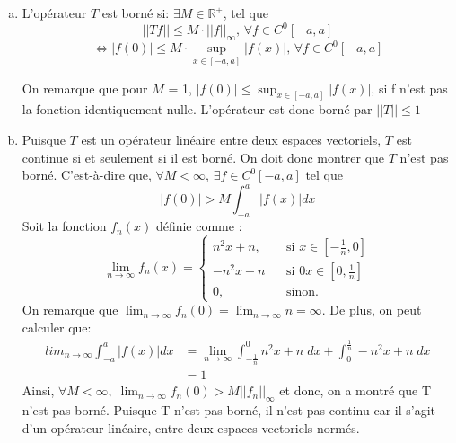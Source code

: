 \documentclass[letterpaper,12pt,oneside,final]{book}
\begin{document}
\begin{enumerate}[a)]

\item %
L'opérateur \( T \) est borné si: \( \exists M \in \mathbb{R}^{+}  \), tel que 
\[ \lvert \lvert  Tf \rvert \rvert \leq M\cdot \lvert \lvert  f \rvert \rvert _{\infty }, \, \forall f \in C^{0}[-a,a] \]
\[ \iff \lvert f(0) \rvert \leq M\cdot \sup_{x\in[-a,a]} \lvert f(x) \rvert , \, \forall f\in C^{0}[-a,a] \]

On remarque que pour \( M \) = 1, \( \lvert f(0) \rvert \leq \sup_{x\in [-a,a]} \lvert f(x) \rvert  \), si f n'est 
pas la fonction identiquement nulle.
L'opérateur est donc borné par \( \lvert \lvert  T \rvert \rvert \leq 1 \)


\item %
Puisque \( T \) est un opérateur linéaire entre deux espaces vectoriels, \( T \) est continue si et 
seulement si il est borné. On doit donc montrer que \( T \) n'est pas borné. C'est-à-dire que, 
\( \forall M < \infty, \, \exists f \in C^{0}[-a,a] \) tel que
\[ \lvert f(0) \rvert > M \int_{-a}^{a} \lvert f(x) \rvert dx \]
Soit la fonction \( f_{n}(x)\) définie comme : 
\begin{equation*}
\lim_{n \to \infty}f_{n}(x) = \begin{cases}
        n^{2}x + n, &\;\; \text{ si } x\in [-\frac{1}{n},0] \\ 
        -n^{2}x +n &\;\; \text{ si } 0  x \in [0,\frac{1}{n}]\\ 
        0, & \;\; \text{ sinon}.
    \end{cases}
\end{equation*}
On remarque que \( \lim_{n \to \infty} f_n (0) = \lim_{n \to \infty} n = \infty \). De plus, on peut calculer que:
\begin{equation*}
\begin{split}
    lim_{n \to \infty} \int_{-a}^{a}\lvert f(x) \rvert dx & = \lim_{n \to \infty} \int_{-\frac{1}{n}}^{0} n^{2}x+ n\;dx + 
\int_{0}^{\frac{1}{n}} -n^{2}x + n\;dx \\ 
& = 1
\end{split}
\end{equation*}
Ainsi, \( \forall M < \infty, \; \lim_{n \to \infty} f_n(0) > M \lvert \lvert  f_{n} \rvert \rvert_{\infty } \)
et donc, on a montré que T n'est pas borné. 
Puisque T n'est pas borné, il n'est pas continu car il s'agit d'un opérateur linéaire, entre deux espaces vectoriels normés.
\end{enumerate}
\end{document}
